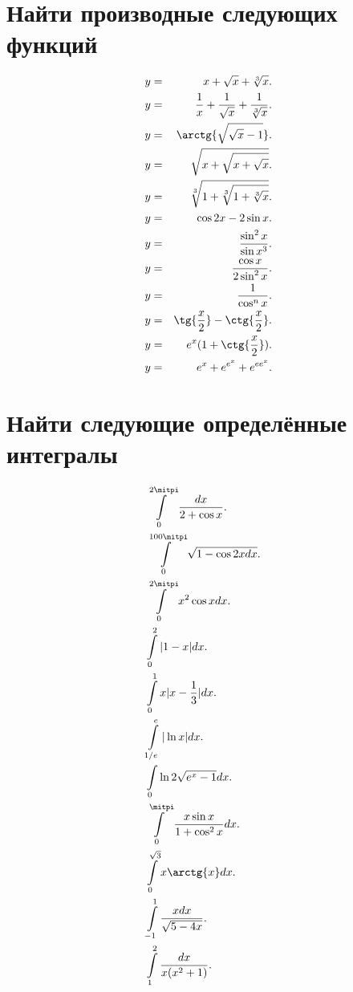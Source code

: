 \documentclass[10pt,a4paper]{scrartcl}
\begin{document}
\section{Найти производные следующих функций}

\begin{eqnarray}
  y & = & x + \sqrt{x} + \sqrt[3]{x}. \\
  y & = & \frac{1}{x} + \frac{1}{\sqrt{x}} + \frac{1}{\sqrt[3]{x}}. \\
  y & = & \arctg{\sqrt{\sqrt{x} - 1}}. \\
  y & = & \sqrt{x + \sqrt{x + \sqrt{x}}}. \\
  y & = & \sqrt[3]{1 + \sqrt[3]{1 + \sqrt[3]{x}}}. \\
  y & = & \cos{2 x} - 2 \sin{x}. \\
  y & = & \frac{\sin^2{x}}{\sin{x^3}}. \\
  y & = & \frac{\cos{x}}{2 \sin^2{x}}. \\
  y & = & \frac{1}{\cos^n{x}}. \\
  y & = & \tg{\frac{x}{2}} - \ctg{\frac{x}{2}}. \\
  y & = & e^x (1 + \ctg{\frac{x}{2}}). \\
  y & = & e^x + e^{e^x} + e^{e e^x}.
\end{eqnarray}

\section{Найти следующие определённые интегралы}

\begin{eqnarray}
  & \int\limits_{0}^{2\pi} {\frac{dx}{2 + \cos{x}}}. & \\
  & \int\limits_{0}^{100\pi} {\sqrt{1 - \cos{2 x} dx}}. & \\
  & \int\limits_{0}^{2\pi} {x^2 \cos{x} dx}. & \\
  & \int\limits_{0}^{2} {|1 - x| dx}. & \\
  & \int\limits_{0}^{1} {x |x - \frac{1}{3}| dx}. & \\
  & \int\limits_{1/e}^{e} {|\ln{x}| dx}. & \\
  & \int\limits_{0}{\ln{2}} {\sqrt{e^x - 1} dx}. \\
  & \int\limits_{0}^{\pi} {\frac{x \sin{x}}{1 + \cos^2{x}} dx}. & \\
  & \int\limits_{0}^{\sqrt{3}} {x \arctg{x} dx}. & \\
  & \int\limits_{-1}^{1} {\frac{x dx}{\sqrt{5 - 4x}}}. & \\
  & \int\limits_{1}^{2} {\frac{dx}{x (x^2 + 1)}}. & \\
\end{eqnarray}
\end{document}
